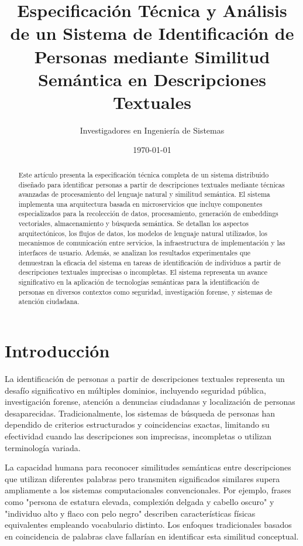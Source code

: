 \documentclass[12pt,a4paper]{article}
\title{Especificación Técnica y Análisis de un Sistema de Identificación de Personas mediante Similitud Semántica en Descripciones Textuales}
\author{Investigadores en Ingeniería de Sistemas}
\date{\today}
\begin{document}
\maketitle

\begin{abstract}
Este artículo presenta la especificación técnica completa de un sistema distribuido diseñado para identificar personas a partir de descripciones textuales mediante técnicas avanzadas de procesamiento del lenguaje natural y similitud semántica. El sistema implementa una arquitectura basada en microservicios que incluye componentes especializados para la recolección de datos, procesamiento, generación de embeddings vectoriales, almacenamiento y búsqueda semántica. Se detallan los aspectos arquitectónicos, los flujos de datos, los modelos de lenguaje natural utilizados, los mecanismos de comunicación entre servicios, la infraestructura de implementación y las interfaces de usuario. Además, se analizan los resultados experimentales que demuestran la eficacia del sistema en tareas de identificación de individuos a partir de descripciones textuales imprecisas o incompletas. El sistema representa un avance significativo en la aplicación de tecnologías semánticas para la identificación de personas en diversos contextos como seguridad, investigación forense, y sistemas de atención ciudadana.
\end{abstract}

\tableofcontents

\newpage

\section{Introducción}
\label{sec:introduccion}

La identificación de personas a partir de descripciones textuales representa un desafío significativo en múltiples dominios, incluyendo seguridad pública, investigación forense, atención a denuncias ciudadanas y localización de personas desaparecidas. Tradicionalmente, los sistemas de búsqueda de personas han dependido de criterios estructurados y coincidencias exactas, limitando su efectividad cuando las descripciones son imprecisas, incompletas o utilizan terminología variada. 

La capacidad humana para reconocer similitudes semánticas entre descripciones que utilizan diferentes palabras pero transmiten significados similares supera ampliamente a los sistemas computacionales convencionales. Por ejemplo, frases como "persona de estatura elevada, complexión delgada y cabello oscuro" y "individuo alto y flaco con pelo negro" describen características físicas equivalentes empleando vocabulario distinto. Los enfoques tradicionales basados en coincidencia de palabras clave fallarían en identificar esta similitud conceptual.
\end{document}
